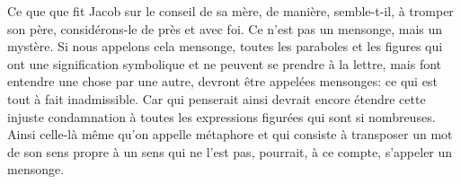 Ce que que fit Jacob sur le conseil de sa mère,
	de manière, semble-t-il, à tromper son père,
	considérons-le de près et avec foi.
Ce n’est pas un mensonge, mais un mystère.
Si nous appelons cela mensonge,
	toutes les paraboles et les figures qui ont une signification symbolique
	et ne peuvent se prendre à la lettre,
		mais font entendre une chose par une autre,
	devront être appelées mensonges:
	ce qui est tout à fait inadmissible.
Car qui penserait ainsi devrait encore étendre cette injuste condamnation
	à toutes les expressions figurées qui sont si nombreuses.
Ainsi celle-là même qu’on appelle métaphore
	et qui consiste à transposer un mot
		de son sens propre à un sens qui ne l’est pas,
	pourrait, à ce compte, s’appeler un mensonge.
